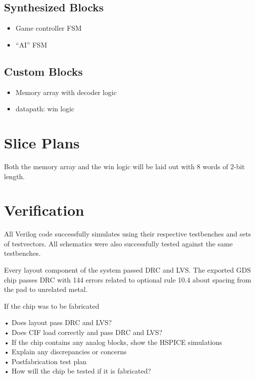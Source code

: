 \documentclass[]{article}
\begin{document}
\subsection{Synthesized Blocks}
\begin{itemize}
\item Game controller FSM
\item ``AI'' FSM
\end{itemize}

\subsection{Custom Blocks}
\begin{itemize}
\item Memory array with decoder logic
 \item datapath: win logic
 \end{itemize}

\section{Slice Plans}
Both the memory array and the win logic will be laid out with 8 words of 2-bit length.



\section{Verification}
\label{sec:verification}

All Verilog code successfully simulates using their respective testbenches and sets of testvectors. All schematics were also successfully tested against the same testbenches.

Every layout component of the system passed DRC and LVS. The exported GDS chip passes DRC with 144 errors related to optional rule 10.4 about spacing from the pad to unrelated metal. 

If the chip was to be fabricated

• Does layout pass DRC and LVS?\\
• Does CIF load correctly and pass DRC and LVS?\\
• If the chip contains any analog blocks, show the HSPICE simulations\\
• Explain any discrepancies or concerns\\
• Postfabrication test plan\\
• How will the chip be tested if it is fabricated?
\end{document}
